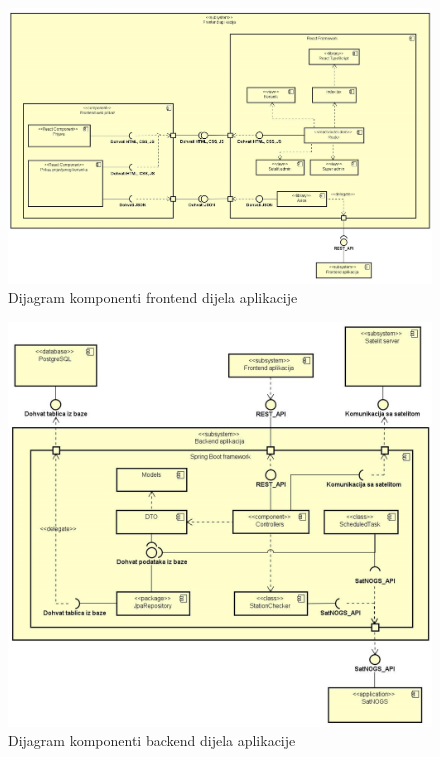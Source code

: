 		\begin{figure}[H]
			\includegraphics[width=\linewidth]{Component_diagram1.png}
			\caption{Dijagram komponenti frontend dijela aplikacije}
			\label{fig:dijagramKomponenti1}
		\end{figure}
		\begin{figure}[H]
			\includegraphics[width=\linewidth]{Component_diagram2.png}
			\caption{Dijagram komponenti backend dijela aplikacije}
			\label{fig:dijagramKomponenti2}
		\end{figure}